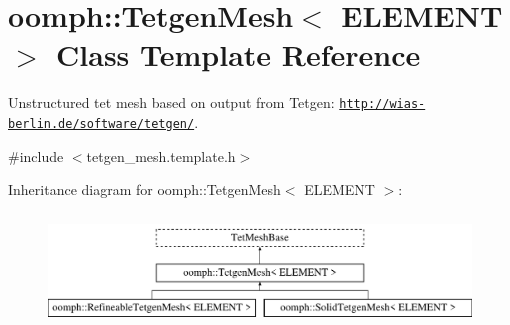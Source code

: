 \hypertarget{classoomph_1_1TetgenMesh}{}\section{oomph\+:\+:Tetgen\+Mesh$<$ E\+L\+E\+M\+E\+NT $>$ Class Template Reference}
\label{classoomph_1_1TetgenMesh}


Unstructured tet mesh based on output from Tetgen\+: \href{http://wias-berlin.de/software/tetgen/}{\tt http\+://wias-\/berlin.\+de/software/tetgen/}.  




{\ttfamily \#include $<$tetgen\+\_\+mesh.\+template.\+h$>$}

Inheritance diagram for oomph\+:\+:Tetgen\+Mesh$<$ E\+L\+E\+M\+E\+NT $>$\+:\begin{figure}[H]
\begin{center}
\leavevmode
\includegraphics[height=3.000000cm]{classoomph_1_1TetgenMesh}
\end{center}
\end{figure}

